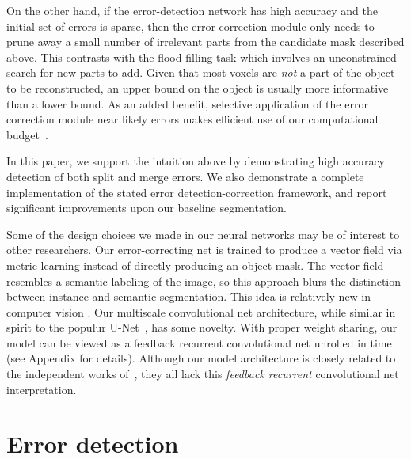 \documentclass{article}
\begin{document}
On the other hand, if the error-detection network has high accuracy and the initial set of errors is sparse, then the error correction module only needs to prune away a small number of irrelevant parts from the candidate mask described above. This contrasts with the flood-filling task which involves an unconstrained search for new parts to add. Given that most voxels are \textit{not} a part of the object to be reconstructed, an upper bound on the object is usually more informative than a lower bound. As an added benefit, selective application of the error correction module near likely errors makes efficient use of our computational budget~\cite{multipass}.

In this paper, we support the intuition above by demonstrating high accuracy detection of both split and merge errors. We also demonstrate a complete implementation of the stated error detection-correction framework, and report significant improvements upon our baseline segmentation.


Some of the design choices we made in our neural networks may be of interest to
other researchers. Our error-correcting net is trained to produce a vector field
via metric learning instead of directly producing an object mask. The vector
field resembles a semantic labeling of the image, so this approach blurs the
distinction between instance and semantic segmentation. This idea is relatively
new in computer vision
\cite{harley2015metric,fathi2017metric,brabandere2017metric}. Our multiscale
convolutional net architecture, while similar in spirit to the populur
U-Net~\cite{unet}, has some novelty. With proper weight sharing, our model can
be viewed as a feedback recurrent convolutional net unrolled in time (see
Appendix for details). Although our model architecture is closely related to the
independent works of~\cite{neuralfabric,mdnet,gridnet}, they all lack this \emph{feedback recurrent} convolutional net interpretation.

\section{Error detection}
\end{document}
